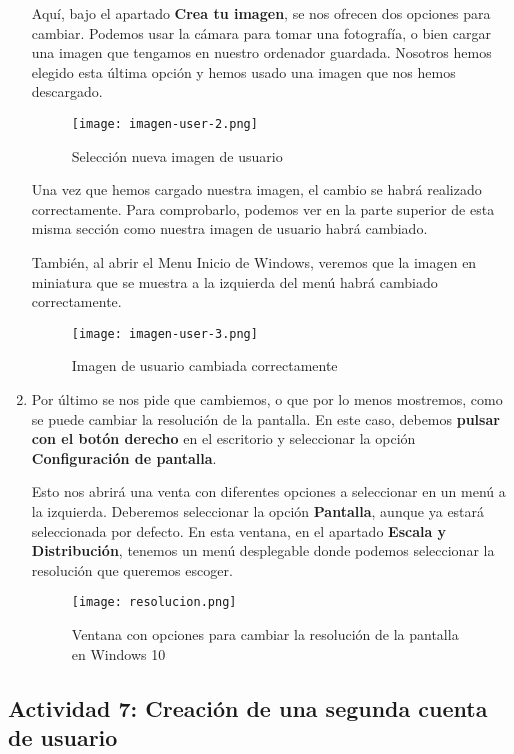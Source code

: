 \begin{enumerate}
    Aquí, bajo el apartado \textbf{Crea tu imagen}, se nos ofrecen dos opciones para cambiar. Podemos usar la cámara para tomar una fotografía, o bien cargar una imagen que tengamos en nuestro ordenador guardada. Nosotros hemos elegido esta última opción y hemos usado una imagen que nos hemos descargado.

    \begin{figure}[H]
        \centering
        \texttt{[image: imagen-user-2.png]}
        \caption{Selección nueva imagen de usuario}
    \end{figure}

    Una vez que hemos cargado nuestra imagen, el cambio se habrá realizado correctamente. Para comprobarlo, podemos ver en la parte superior de esta misma sección como nuestra imagen de usuario habrá cambiado.

    También, al abrir el Menu Inicio de Windows, veremos que la imagen en miniatura que se muestra a la izquierda del menú habrá cambiado correctamente.

    \begin{figure}[H]
        \centering
        \texttt{[image: imagen-user-3.png]}
        \caption{Imagen de usuario cambiada correctamente}
    \end{figure}

    \item Por último se nos pide que cambiemos, o que por lo menos mostremos, como se puede cambiar la resolución de la pantalla. En este caso, debemos \textbf{pulsar con el botón derecho} en el escritorio y seleccionar la opción \textbf{Configuración de pantalla}.

    Esto nos abrirá una venta con diferentes opciones a seleccionar en un menú a la izquierda. Deberemos seleccionar la opción \textbf{Pantalla}, aunque ya estará seleccionada por defecto. En esta ventana, en el apartado \textbf{Escala y Distribución}, tenemos un menú desplegable donde podemos seleccionar la resolución que queremos escoger.

    \begin{figure}[H]
        \centering
        \texttt{[image: resolucion.png]}
        \caption{Ventana con opciones para cambiar la resolución de la pantalla en Windows 10}
    \end{figure}
\end{enumerate}

\subsection{Actividad 7: Creación de una segunda cuenta de usuario}

